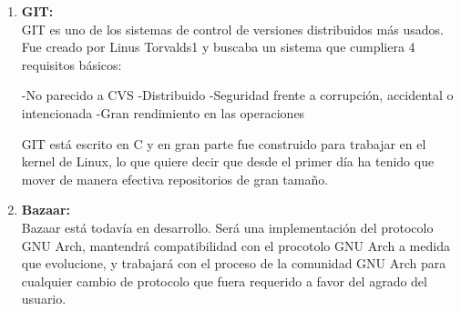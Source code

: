\begin{enumerate}[1.]
\item \textbf{GIT:} \\

GIT es uno de los sistemas de control de versiones distribuidos más usados. Fue creado por Linus Torvalds1 y buscaba un sistema que cumpliera 4 requisitos básicos:

-No parecido a CVS
-Distribuido
-Seguridad frente a corrupción, accidental o intencionada
-Gran rendimiento en las operaciones

GIT está escrito en C y en gran parte fue construido para trabajar en el kernel de Linux, lo que quiere decir que desde el primer día ha tenido que mover de manera efectiva repositorios de gran tamaño.\\

\item \textbf{Bazaar:} \\

Bazaar está todavía en desarrollo. Será una implementación del protocolo GNU Arch, mantendrá compatibilidad con el procotolo GNU Arch a medida que evolucione, y trabajará con el proceso de la comunidad GNU Arch para cualquier cambio de protocolo que fuera requerido a favor del agrado del usuario.\\

\end{enumerate}


